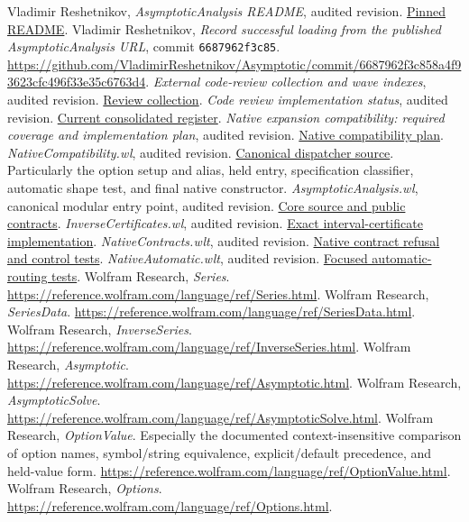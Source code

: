 \documentclass[11pt,a4paper]{article}
\newcommand{\repo}[2]{\href{https://github.com/VladimirReshetnikov/Asymptotic/blob/6687962f3c858a4f93623cfc496f33e35c6763d4/#1}{#2}}
\begin{document}
\begin{thebibliography}{99}
 Vladimir Reshetnikov, \emph{AsymptoticAnalysis README}, audited revision. \repo{README.md}{Pinned README}.
 Vladimir Reshetnikov, \emph{Record successful loading from the published AsymptoticAnalysis URL}, commit \texttt{6687962f3c85}. \url{https://github.com/VladimirReshetnikov/Asymptotic/commit/6687962f3c858a4f93623cfc496f33e35c6763d4}.
 \emph{External code-review collection and wave indexes}, audited revision. \href{https://github.com/VladimirReshetnikov/Asymptotic/tree/6687962f3c858a4f93623cfc496f33e35c6763d4/external-reports/code-review}{Review collection}.
 \emph{Code review implementation status}, audited revision. \repo{docs/development/CODE_REVIEW_STATUS.md}{Current consolidated register}.
 \emph{Native expansion compatibility: required coverage and implementation plan}, audited revision. \repo{docs/development/NATIVE_COMPATIBILITY.md}{Native compatibility plan}.
 \emph{NativeCompatibility.wl}, audited revision. \repo{src/Kernel/NativeCompatibility.wl}{Canonical dispatcher source}. Particularly the option setup and alias, held entry, specification classifier, automatic shape test, and final native constructor.
 \emph{AsymptoticAnalysis.wl}, canonical modular entry point, audited revision. \repo{src/Kernel/AsymptoticAnalysis.wl}{Core source and public contracts}.
 \emph{InverseCertificates.wl}, audited revision. \repo{src/Kernel/InverseCertificates.wl}{Exact interval-certificate implementation}.
 \emph{NativeContracts.wlt}, audited revision. \repo{src/Tests/NativeContracts.wlt}{Native contract refusal and control tests}.
 \emph{NativeAutomatic.wlt}, audited revision. \repo{src/Tests/NativeAutomatic.wlt}{Focused automatic-routing tests}.
 Wolfram Research, \emph{Series}. \url{https://reference.wolfram.com/language/ref/Series.html}.
 Wolfram Research, \emph{SeriesData}. \url{https://reference.wolfram.com/language/ref/SeriesData.html}.
 Wolfram Research, \emph{InverseSeries}. \url{https://reference.wolfram.com/language/ref/InverseSeries.html}.
 Wolfram Research, \emph{Asymptotic}. \url{https://reference.wolfram.com/language/ref/Asymptotic.html}.
 Wolfram Research, \emph{AsymptoticSolve}. \url{https://reference.wolfram.com/language/ref/AsymptoticSolve.html}.
 Wolfram Research, \emph{OptionValue}. Especially the documented context-insensitive comparison of option names, symbol/string equivalence, explicit/default precedence, and held-value form. \url{https://reference.wolfram.com/language/ref/OptionValue.html}.
 Wolfram Research, \emph{Options}. \url{https://reference.wolfram.com/language/ref/Options.html}.
\end{thebibliography}
\end{document}
